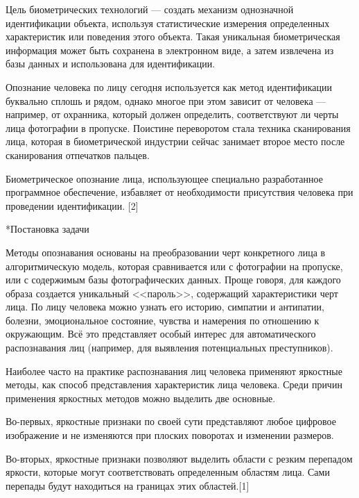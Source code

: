 \documentclass[a4paper,12pt,titlpage]{posobie}
\makeatletter
\renewcommand{\section}{\@startsection{section}{1}{0.0cm}{0.5cm}{0.1cm}%
             {\fontsize{16}{16}\bf\selectfont }}
\makeatother
\begin{document}
    Цель биометрических технологий --- создать механизм однозначной идентификации объекта, 
используя статистические измерения определенных характеристик или поведения этого объекта.
Такая уникальная биометрическая информация может быть сохранена в электронном виде, а затем 
извлечена из базы данных и использована для идентификации. 

    Опознание человека по лицу сегодня используется как метод идентификации буквально сплошь
и рядом, однако многое при этом зависит от человека --- например, от охранника, который
должен определить, соответствуют ли черты лица фотографии в пропуске. Поистине переворотом стала техника сканирования
лица, которая в биометрической индустрии сейчас занимает второе место после сканирования отпечатков пальцев.

    Биометрическое опознание лица, использующее специально разработанное программное обеспечение, 
избавляет от необходимости присутствия человека при проведении идентификации. [2]


\section*{Постановка задачи}

Методы опознавания основаны на преобразовании черт конкретного лица в алгоритмическую модель, которая сравнивается или
с фотографии на пропуске, или с содержимым базы фотографических данных. Проще говоря, для каждого
образа создается уникальный <<пароль>>, содержащий характеристики черт лица. По лицу человека 
можно узнать его историю, симпатии и антипатии, болезни, эмоциональное состояние, 
чувства и намерения по отношению к окружающим. Всё это представляет особый интерес для автоматического
распознавания лиц (например, для выявления потенциальных преступников).
    
    Наиболее часто на практике распознавания лиц человека применяют яркостные методы, как способ представления 
характеристик лица человека. Среди причин применения яркостных методов можно выделить две основные.

    Во-первых, яркостные признаки по своей сути представляют любое цифровое изображение и  
не изменяются при плоских поворотах и изменении размеров.
   
    Во-вторых, яркостные признаки позволяют выделить области с резким перепадом яркости, которые могут
соответствовать определенным областям лица. Сами перепады будут находиться на границах этих областей.[1]
\end{document}
